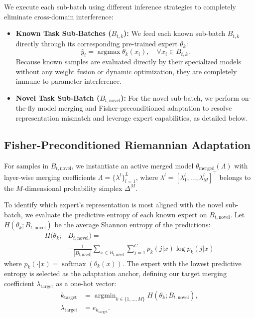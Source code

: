 \documentclass{article}
\theoremstyle{plain}
\theoremstyle{definition}
\theoremstyle{remark}
\begin{document}
We execute each sub-batch using different inference strategies to completely eliminate cross-domain interference:
\begin{itemize}
    \item \textbf{Known Task Sub-Batches ($B_{t, k}$):} We feed each known sub-batch $B_{t, k}$ directly through its corresponding pre-trained expert $\theta_k$:
    \begin{equation}
        \hat{y}_i = \operatorname{argmax} \theta_k(x_i), \quad \forall x_i \in B_{t, k}.
    \end{equation}
    Because known samples are evaluated directly by their specialized models without any weight fusion or dynamic optimization, they are completely immune to parameter interference.
    \item \textbf{Novel Task Sub-Batch ($B_{t, \text{novel}}$):} For the novel sub-batch, we perform on-the-fly model merging and Fisher-preconditioned adaptation to resolve representation mismatch and leverage expert capabilities, as detailed below.
\end{itemize}

\subsection{Fisher-Preconditioned Riemannian Adaptation}
For samples in $B_{t, \text{novel}}$, we instantiate an active merged model $\theta_{\text{merged}}(\Lambda)$ with layer-wise merging coefficients $\Lambda = \{\lambda^l\}_{l=1}^L$, where $\lambda^l = [\lambda_1^l, \dots, \lambda_M^l]^\top$ belongs to the $M$-dimensional probability simplex $\Delta^M$. 

To identify which expert's representation is most aligned with the novel sub-batch, we evaluate the predictive entropy of each known expert on $B_{t, \text{novel}}$. Let $H(\theta_k; B_{t, \text{novel}})$ be the average Shannon entropy of the predictions:
\begin{align}
    H(\theta_k; &B_{t, \text{novel}}) = \nonumber \\
    &- \frac{1}{|B_{t, \text{novel}}|} \sum_{x \in B_{t, \text{novel}}} \sum_{j=1}^C p_k(j|x) \log p_k(j|x)
\end{align}
where $p_k(\cdot|x) = \operatorname{softmax}(\theta_k(x))$. The expert with the lowest predictive entropy is selected as the adaptation anchor, defining our target merging coefficient $\lambda_{\text{target}}$ as a one-hot vector:
\begin{align}
    k_{\text{target}} &= \operatorname{argmin}_{k \in \{1, \dots, M\}} H(\theta_k; B_{t, \text{novel}}), \\
    \lambda_{\text{target}} &= e_{k_{\text{target}}}.
\end{align}
\end{document}
